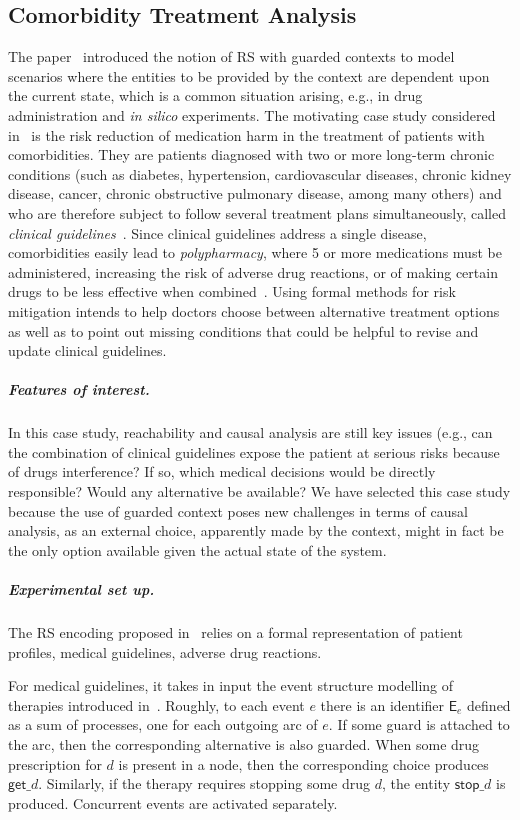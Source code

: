 
\subsection{Comorbidity Treatment Analysis}

The paper~\cite{DBLP:conf/cmsb/BowlesBBFGM24} introduced the notion of RS with guarded contexts to model scenarios where the entities to be provided by the context are dependent upon the current state, which is a common situation arising, e.g., in drug administration and \emph{in silico} experiments. The motivating case study considered in~\cite{DBLP:conf/cmsb/BowlesBBFGM24} is the risk reduction of medication harm in the treatment of patients with comorbidities. They are patients diagnosed with two or more long-term chronic conditions (such as diabetes, hypertension, cardiovascular diseases, chronic kidney disease, cancer, chronic obstructive pulmonary disease, among many others) and who are therefore subject to follow several treatment plans simultaneously, called \emph{clinical guidelines}~\cite{feder1999using,woolf1999potential}. Since clinical guidelines address a single disease, comorbidities easily lead to  \emph{polypharmacy}, where 5 or more medications must be administered, increasing the risk of adverse drug reactions, or of making certain drugs to be less effective when combined~\cite{Gut12}. Using formal methods for risk mitigation intends to help doctors choose between alternative treatment options as well as to point out missing conditions that could be helpful to revise and update clinical guidelines. 

\subparagraph*{Features of interest.}
In this case study, reachability and causal analysis are still key issues (e.g., can the combination of clinical guidelines expose the patient at serious risks because of drugs interference? If so, which medical decisions would be directly responsible? Would any alternative be available?
We have selected this case study because the use of guarded context poses new challenges in terms of causal analysis, as an external choice, apparently made by the context, might in fact be the only option available given the actual state of the system. 

\subparagraph*{Experimental set up.}
The RS encoding proposed in~\cite{DBLP:conf/cmsb/BowlesBBFGM24} relies on a formal representation of patient profiles, medical guidelines, adverse drug reactions.

For medical guidelines, it takes in input the event structure modelling of therapies introduced in~\cite{BC17c}. Roughly, to each event $e$ there is an identifier $\mathsf{E}_e$ defined as a sum of processes, one for each outgoing arc of $e$. If some guard is attached to the arc, then the corresponding alternative is also guarded. When some drug prescription for $d$ is present in a node, then the corresponding choice produces $\mathsf{get}\_d$. Similarly, if the therapy requires stopping some drug $d$, the entity $\mathsf{stop}\_d$ is produced.
Concurrent events are activated separately. 

